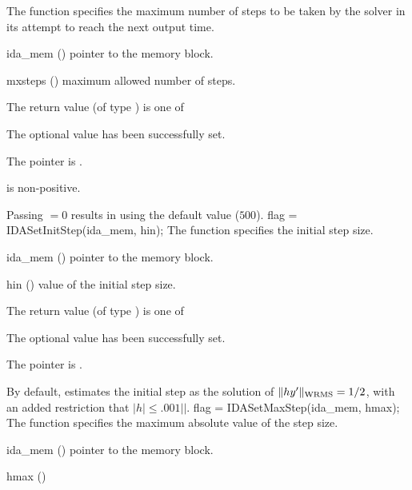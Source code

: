 {{}
{
  The function  specifies the maximum number
  of steps to be taken by the solver in its attempt to reach 
  the next output time.
}
{
  \begin{args}
  \item[ida\_mem] ()
    pointer to the {\ida} memory block.
  \item[mxsteps] ()
    maximum allowed number of steps.
  \end{args}
}
{
  The return value  (of type ) is one of
  \begin{args}
  \item[\Id{IDA\_SUCCESS}] 
    The optional value has been successfully set.
  \item[\Id{IDA\_MEM\_NULL}]
    The  pointer is .
  \item[\Id{IDA\_ILL\_INPUT}]
     is non-positive.
  \end{args}
}
{
  Passing $=0$ results in {\ida} using the default value ($500$).
}
{
flag = IDASetInitStep(ida\_mem, hin);
}
{
  The function  specifies the initial step size.
}
{
  \begin{args}
  \item[ida\_mem] ()
    pointer to the {\ida} memory block.
  \item[hin] ()
    value of the initial step size.
  \end{args}
}
{
  The return value  (of type ) is one of
  \begin{args}
  \item[\Id{IDA\_SUCCESS}] 
    The optional value has been successfully set.
  \item[\Id{IDA\_MEM\_NULL}]
    The  pointer is .
  \end{args}
}
{
  By default, {\ida} estimates the initial step as the solution of 
  $\|h y' \|_{\mbox{\scriptsize WRMS}} = 1/2$, with an added restriction
  that $|h| \leq .001|$$|$.
}
{
flag = IDASetMaxStep(ida\_mem, hmax);
}
{
  The function  specifies the maximum absolute
  value of the step size.
}
{
  \begin{args}
  \item[ida\_mem] ()
    pointer to the {\ida} memory block.
  \item[hmax] ()

\end{args}}}
